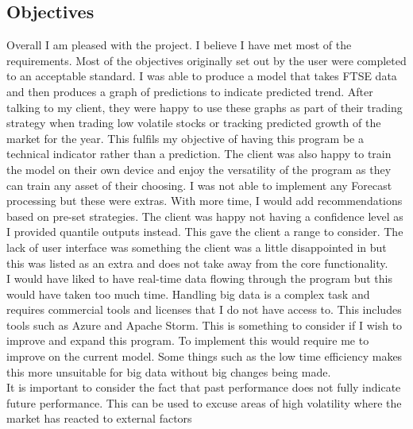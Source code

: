 \documentclass{article}
\begin{document}
\subsection{Objectives}
Overall I am pleased with the project. I believe I have met most of the requirements.
Most of the objectives originally set out by the user were completed to an
acceptable standard. I was able to produce a model that takes FTSE data and then
produces a graph of predictions to indicate predicted trend. After talking to
my client, they were happy to use these graphs as part of their trading strategy
when trading low volatile stocks or tracking predicted growth of the market for
the year. This fulfils my objective of having this program be a technical indicator
rather than a prediction. The client was also happy to train the model on their
own device and enjoy the versatility of the program as they can train any asset
of their choosing. I was not able to implement any Forecast processing but these were
extras. With more time, I would add recommendations based on pre-set strategies.
The client was happy not having a confidence level as I provided quantile outputs
instead. This gave the client a range to consider. The lack of user interface
was something the client was a little disappointed in but this was listed as an
extra and does not take away from the core functionality.
\\
I would have liked to have real-time data flowing through the program but this
would have taken too much time. Handling big data is a complex task and requires
commercial tools and licenses that I do not have access to. This includes tools
such as Azure and Apache Storm. This is something to consider if I wish to improve
and expand this program. To implement this would require me to improve on the current
model. Some things such as the low time efficiency makes this more unsuitable for
big data without big changes being made.
\\
It is important to consider the fact that past performance does not fully indicate
future performance. This can be used to excuse areas of high volatility where the
market has reacted to external factors
\end{document}
